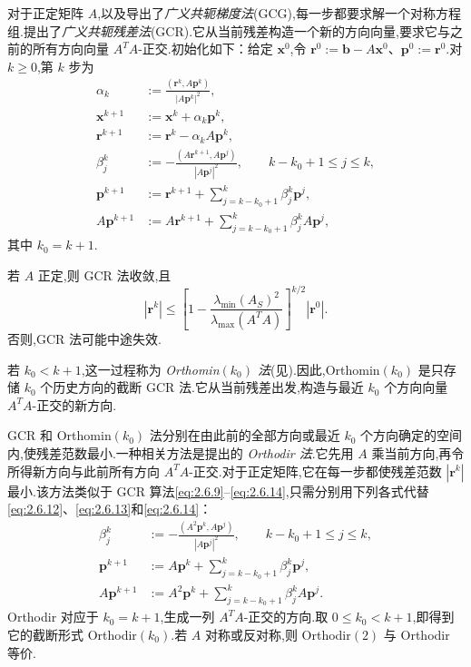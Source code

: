对于正定矩阵 \(A\),以及导出了\emph{广义共轭梯度法}(GCG),每一步都要求解一个对称方程组.提出了\emph{广义共轭残差法}(GCR).它从当前残差构造一个新的方向向量,要求它与之前的所有方向向量 \(A^TA\)-正交.初始化如下：给定 \(\boldsymbol{x}^0\),令 \(\boldsymbol{r}^0:=\boldsymbol{b}-A\boldsymbol{x}^0\)、\(\boldsymbol{p}^0:=\boldsymbol{r}^0\).对 \(k\ge0\),第 \(k\) 步为
\begin{align}
  \alpha_k&:=\frac{(\boldsymbol{r}^k,A\boldsymbol{p}^k)}{|A\boldsymbol{p}^k|^2},\label{eq:2.6.9}\\
  \boldsymbol{x}^{k+1}&:=\boldsymbol{x}^k+\alpha_k\boldsymbol{p}^k,\label{eq:2.6.10}\\
  \boldsymbol{r}^{k+1}&:=\boldsymbol{r}^k-\alpha_kA\boldsymbol{p}^k,\label{eq:2.6.11}\\
  \beta_j^k&:=-\frac{(A\boldsymbol{r}^{k+1},A\boldsymbol{p}^j)}{|A\boldsymbol{p}^j|^2},
                     \qquad k-k_0+1\le j\le k,\label{eq:2.6.12}\\
  \boldsymbol{p}^{k+1}&:=\boldsymbol{r}^{k+1}
       +\sum_{j=k-k_0+1}^k\beta_j^k\boldsymbol{p}^j,\label{eq:2.6.13}\\
  A\boldsymbol{p}^{k+1}&:=A\boldsymbol{r}^{k+1}
       +\sum_{j=k-k_0+1}^k\beta_j^k A\boldsymbol{p}^j,\label{eq:2.6.14}
\end{align}
其中 \(k_0=k+1\).

若 \(A\) 正定,则 GCR 法收敛,且
\begin{equation}\label{eq:2.6.15}
  |\boldsymbol{r}^k|\le
  \left[1-\frac{\lambda_{\min}(A_S)^2}{\lambda_{\max}(A^TA)}\right]^{k/2}
  |\boldsymbol{r}^0|.
\end{equation}
否则,GCR 法可能中途失效.

若 \(k_0<k+1\),这一过程称为 \emph{Orthomin\((k_0)\) 法}(见).因此,Orthomin\((k_0)\) 是只存储 \(k_0\) 个历史方向的截断 GCR 法.它从当前残差出发,构造与最近 \(k_0\) 个方向向量 \(A^TA\)-正交的新方向.

GCR 和 Orthomin\((k_0)\) 法分别在由此前的全部方向或最近 \(k_0\) 个方向确定的空间内,使残差范数最小.一种相关方法是提出的 \emph{Orthodir 法}.它先用 \(A\) 乘当前方向,再令所得新方向与此前所有方向 \(A^TA\)-正交.对于正定矩阵,它在每一步都使残差范数 \(|\boldsymbol{r}^k|\) 最小.该方法类似于 GCR 算法\eqref{eq:2.6.9}–\eqref{eq:2.6.14},只需分别用下列各式代替\eqref{eq:2.6.12}、\eqref{eq:2.6.13}和\eqref{eq:2.6.14}：
\begin{align}
  \beta_j^k&:=-\frac{(A^2\boldsymbol{p}^k,A\boldsymbol{p}^j)}{|A\boldsymbol{p}^j|^2},
                      \qquad k-k_0+1\le j\le k,\label{eq:2.6.16}\\
  \boldsymbol{p}^{k+1}&:=A\boldsymbol{p}^k+\sum_{j=k-k_0+1}^k\beta_j^k\boldsymbol{p}^j,\label{eq:2.6.17}\\
  A\boldsymbol{p}^{k+1}&:=A^2\boldsymbol{p}^k+\sum_{j=k-k_0+1}^k\beta_j^k A\boldsymbol{p}^j.\label{eq:2.6.18}
\end{align}
Orthodir 对应于 \(k_0=k+1\),生成一列 \(A^TA\)-正交的方向.取 \(0\le k_0<k+1\),即得到它的截断形式 Orthodir\((k_0)\).若 \(A\) 对称或反对称,则 Orthodir\((2)\) 与 Orthodir 等价.

